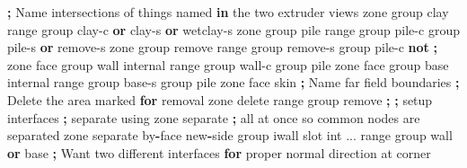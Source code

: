 \documentclass[a4paper, nobind]{templates/ociamthesis}
\newenvironment{Shaded}{\begin{snugshade}}{\end{snugshade}}
\newcommand{\BuiltInTok}[1]{#1}
\newcommand{\ControlFlowTok}[1]{\textcolor[rgb]{0.13,0.29,0.53}{\textbf{#1}}}
\newcommand{\KeywordTok}[1]{\textcolor[rgb]{0.13,0.29,0.53}{\textbf{#1}}}
\newcommand{\NormalTok}[1]{#1}
\newcommand{\OperatorTok}[1]{\textcolor[rgb]{0.81,0.36,0.00}{\textbf{#1}}}
\newcommand{\StringTok}[1]{\textcolor[rgb]{0.31,0.60,0.02}{#1}}
\renewenvironment{Shaded}
{
  \vspace{10pt}%
  \begin{snugshade}%
}{%
  \end{snugshade}%
  \vspace{8pt}%
}
\begin{document}
\begin{Shaded}
\begin{Highlighting}[]
\OperatorTok{;}\NormalTok{ Name intersections of things named }\KeywordTok{in}\NormalTok{ the two extruder views}
\NormalTok{zone group }\StringTok{\textquotesingle{}clay\textquotesingle{}} \BuiltInTok{range}\NormalTok{ group }\StringTok{\textquotesingle{}clay{-}c\textquotesingle{}} \KeywordTok{or} \StringTok{\textquotesingle{}clay{-}s\textquotesingle{}} \KeywordTok{or} \StringTok{\textquotesingle{}wetclay{-}s\textquotesingle{}}
\NormalTok{zone group }\StringTok{\textquotesingle{}pile\textquotesingle{}} \BuiltInTok{range}\NormalTok{ group }\StringTok{\textquotesingle{}pile{-}c\textquotesingle{}}\NormalTok{ group }\StringTok{\textquotesingle{}pile{-}s\textquotesingle{}} \KeywordTok{or} \StringTok{\textquotesingle{}remove{-}s\textquotesingle{}}
\NormalTok{zone group }\StringTok{\textquotesingle{}remove\textquotesingle{}} \BuiltInTok{range}\NormalTok{ group }\StringTok{\textquotesingle{}remove{-}s\textquotesingle{}}\NormalTok{ group }\StringTok{\textquotesingle{}pile{-}c\textquotesingle{}} \KeywordTok{not} \OperatorTok{;} 
\NormalTok{zone face group }\StringTok{\textquotesingle{}wall\textquotesingle{}}\NormalTok{ internal }\BuiltInTok{range}\NormalTok{ group }\StringTok{\textquotesingle{}wall{-}c\textquotesingle{}}\NormalTok{ group }\StringTok{\textquotesingle{}pile\textquotesingle{}}
\NormalTok{zone face group }\StringTok{\textquotesingle{}base\textquotesingle{}}\NormalTok{ internal }\BuiltInTok{range}\NormalTok{ group }\StringTok{\textquotesingle{}base{-}s\textquotesingle{}}\NormalTok{ group }\StringTok{\textquotesingle{}pile\textquotesingle{}}
\NormalTok{zone face skin }\OperatorTok{;}\NormalTok{ Name far field boundaries}
\OperatorTok{;}\NormalTok{ Delete the area marked }\ControlFlowTok{for}\NormalTok{ removal}
\NormalTok{zone delete }\BuiltInTok{range}\NormalTok{ group }\StringTok{\textquotesingle{}remove\textquotesingle{}}
\OperatorTok{;}
\OperatorTok{;}\NormalTok{ setup interfaces}
\OperatorTok{;}\NormalTok{ separate using zone separate}
\OperatorTok{;} \BuiltInTok{all}\NormalTok{ at once so common nodes are separated}
\NormalTok{zone separate by}\OperatorTok{{-}}\NormalTok{face new}\OperatorTok{{-}}\NormalTok{side group }\StringTok{\textquotesingle{}iwall\textquotesingle{}}\NormalTok{ slot }\StringTok{\textquotesingle{}int\textquotesingle{}}\NormalTok{ ...}
     \BuiltInTok{range}\NormalTok{ group }\StringTok{\textquotesingle{}wall\textquotesingle{}} \KeywordTok{or} \StringTok{\textquotesingle{}base\textquotesingle{}}
\OperatorTok{;}\NormalTok{ Want two different interfaces }\ControlFlowTok{for}\NormalTok{ proper normal direction at corner}

\end{Highlighting}
\end{Shaded}
\end{document}
